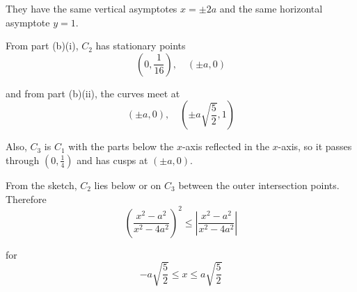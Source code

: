 \documentclass[leqno]{article}
\begin{document}
\begin{enumerate}[
  label=\textbf{\arabic*.},
  leftmargin=*,
  topsep=0pt,
  partopsep=0pt,
  parsep=0pt
]
\begin{djsSolution}
\begin{enumerate}[label=\textbf{(\alph*)}]
  They have the same vertical asymptotes $x=\pm 2a$ and the same horizontal asymptote $y=1$.

  From part (b)(i), $C_2$ has stationary points
  \[
  \left(0,\frac{1}{16}\right),\quad (\pm a,0)
  \]

  and from part (b)(ii), the curves meet at
  \[
  (\pm a,0), \quad \left(\pm a\sqrt{\frac52},1\right)
  \]

  Also, $C_3$ is $C_1$ with the parts below the $x$-axis reflected in the $x$-axis, so it passes through $(0,\tfrac14)$ and has cusps at $(\pm a,0)$.

  From the sketch, $C_2$ lies below or on $C_3$ between the outer intersection points. Therefore
  \[
  \left(\frac{x^2-a^2}{x^2-4a^2}\right)^2 \le \left|\frac{x^2-a^2}{x^2-4a^2}\right|
  \]

  for
  \[
  -a\sqrt{\frac52}\le x\le a\sqrt{\frac52}
  \]
\end{enumerate}
\end{djsSolution}


\end{enumerate}
\end{document}
